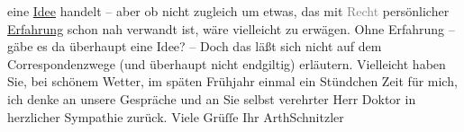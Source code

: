 \begin{ledgroupsized}[t]{13cm}
               eine \uline{Idee} handelt – aber ob nicht zugleich um etwas,
               das mit \textcolor{gray}{Recht} persönlicher \uline{Erfahrung} schon nah verwandt ist, wäre vielleicht zu erwägen. Ohne Erfahrung
               – gäbe es da{\geminationn} überhaupt eine Idee? – Doch das läßt {\pb}sich nicht auf dem Correspondenzwege (und überhaupt nicht
               endgiltig) erläutern. Vielleicht haben Sie, bei schönem Wetter, im späten Frühjahr
               einmal ein Stündchen Zeit für mich, ich denke an unsere Gespräche und an Sie selbst
               verehrter Herr Doktor in herzlicher Sympathie zurück.\pend
           \pstart Viele Grüſſe Ihr \spacefill\mbox{ArthSchnitzler}\pend{}
         
         \endnumbering{}\end{ledgroupsized}  \newcommand{\dateiname}{L02484}\newcommand{\titel}{Arthur Schnitzler an Robert Adam, 9. 4. 1927}\newcommand{\editorInnen}{Martin Anton Müller und Gerd-Hermann Susen}
      